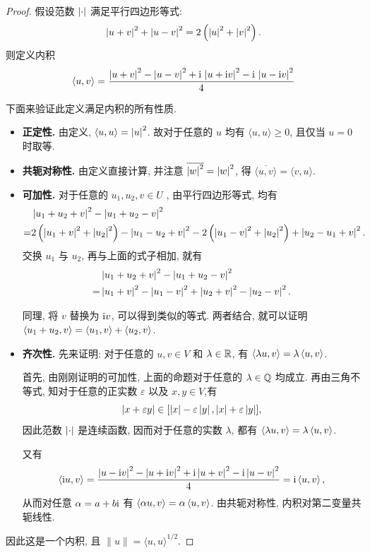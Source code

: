 \documentclass{article}
\begin{document}
\begin{proof}
  假设范数 \( \left|\cdot\right| \) 满足平行四边形等式:
  \[ \left|u+v\right|^2+\left|u-v\right|^2=2\left( \left|u\right|^2+\left|v\right|^2 \right). \]
  则定义内积
  \[
\langle u, v \rangle
= \frac{\left|u+v\right|^2 - \left|u-v\right|^2 + \mathrm{i}\,\left|u+\mathrm{i} v\right|^2 - \mathrm{i}\,\left|u -\mathrm{i} v\right|^2}{4}
\]\par
  下面来验证此定义满足内积的所有性质.
  \begin{itemize}
    \item \textbf{正定性. }由定义, \( \langle u, u \rangle=\left|u\right|^2 \). 故对于任意的 \( u \) 均有 \( \langle u, u \rangle \ge 0 \), 且仅当 \( u=0 \) 时取等.
    \item \textbf{共轭对称性. }由定义直接计算, 并注意 \(\overline{\left|w\right|^2}=\left|w\right|^2\), 得 \( \overline{\langle u, v \rangle}=\langle v, u \rangle \).
    \item \textbf{可加性. }对于任意的 \( u_1,u_2,v\in U \) , 由平行四边形等式, 均有
    \begin{align*}
      &\left|u_1+u_2+v\right|^2-\left|u_1+u_2-v\right|^2\\
      =&2\left( \left|u_1+v\right|^2+\left|u_2\right|^2 \right)-\left|u_1-u_2+v\right|^2-2\left( \left|u_1-v\right|^2+\left|u_2\right|^2 \right)+\left|u_2-u_1+v\right|^2.
    \end{align*}
    交换 \( u_1 \) 与 \( u_2 \), 再与上面的式子相加, 就有
    \begin{align*}
      &\left|u_1+u_2+v\right|^2-\left|u_1+u_2-v\right|^2\\
      =&\left|u_1+v\right|^2-\left|u_1-v\right|^2+\left|u_2+v\right|^2-\left|u_2-v\right|^2.
    \end{align*}\par
    同理, 将 \( v \) 替换为 \( \mathrm{i} v \), 可以得到类似的等式. 两者结合, 就可以证明 \( \left\langle u_1+u_2, v \right\rangle=\left\langle u_1, v \right\rangle+\left\langle u_2, v \right\rangle \).
    \item \textbf{齐次性. }先来证明: 对于任意的 \( u,v\in V \) 和 \( \lambda\in\mathbb{R} \), 有 \( \left\langle \lambda u, v \right\rangle=\lambda\left\langle u, v \right\rangle \).\par
    首先, 由刚刚证明的可加性, 上面的命题对于任意的 \( \lambda\in\mathbb{Q} \) 均成立. 再由三角不等式, 知对于任意的正实数 \( \varepsilon \) 以及 \( x,y\in V \),有
    \[ \left|x+\varepsilon y\right|\in [\left|x\right|-\varepsilon\left|y\right|, \left|x\right|+\varepsilon\left|y\right|], \]
    因此范数 \( \left|\cdot\right| \) 是连续函数, 因而对于任意的实数 \( \lambda \), 都有 \( \left\langle \lambda u, v \right\rangle=\lambda\left\langle u, v \right\rangle \).\par
    又有
    \[
      \left\langle \mathrm{i} u, v \right\rangle
      = \frac{\left|u-\mathrm{i} v\right|^2-\left|u+\mathrm{i} v\right|^2+\mathrm{i}\left|u+v\right|^2-\mathrm{i}\left|u-v\right|^2}{4}
      = \mathrm{i}\left\langle u, v \right\rangle,
    \]
    从而对任意 \( \alpha=a+b\mathrm{i} \) 有 \( \left\langle \alpha u, v \right\rangle=\alpha\left\langle u, v \right\rangle \). 由共轭对称性, 内积对第二变量共轭线性.
     
  \end{itemize}
  因此这是一个内积, 且 \( \lVert u \rVert=\langle u, u \rangle^{1/2} \).
\end{proof}
\end{document}
